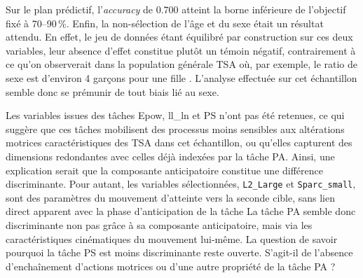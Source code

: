 Sur le plan prédictif, l'\textit{accuracy} de 0.700 atteint la borne inférieure de l'objectif fixé à 70–90\,\%. Enfin, la non-sélection de l'âge et du sexe était un résultat attendu. En effet, le jeu de données étant équilibré par construction sur ces deux variables, leur absence d'effet constitue plutôt un témoin négatif, contrairement à ce qu'on observerait dans la population générale TSA où, par exemple, le ratio de sexe est d'environ 4 garçons pour une fille \parencite{zeidan_global_2022}. L'analyse effectuée sur cet échantillon semble donc se prémunir de tout biais lié au sexe. %

\medskip

Les variables issues des tâches Epow, ll\_ln et PS n'ont pas été retenues, ce qui suggère que ces tâches mobilisent des processus moins sensibles aux altérations motrices caractéristiques des TSA dans cet échantillon, ou qu'elles capturent des dimensions redondantes avec celles déjà indexées par la tâche PA. Ainsi, une explication serait que la composante anticipatoire constitue une différence discriminante. Pour autant, les variables sélectionnées, \texttt{L2\_Large} et \texttt{Sparc\_small}, sont des paramètres du mouvement d'atteinte vers la seconde cible, sans lien direct apparent avec la phase d'anticipation de la tâche %
La tâche PA semble donc discriminante non pas grâce à sa composante anticipatoire, mais via les caractéristiques cinématiques du mouvement lui-même. La question de savoir pourquoi la tâche PS est moins discriminante reste ouverte. S'agit-il de l'absence d'enchaînement d'actions motrices %
ou d'une autre propriété de la tâche PA ?%
	


